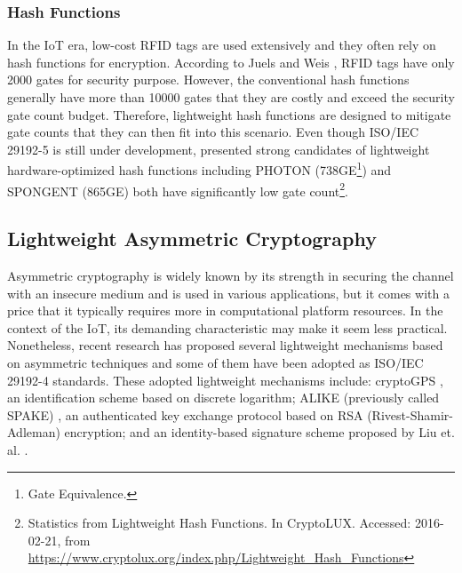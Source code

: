 \subsubsection{Hash Functions}

In the \gls{IoT} era, low-cost \gls{RFID} tags are used extensively and they often rely on hash functions for encryption. According to Juels and Weis \cite{Juels:2005}, \gls{RFID} tags have only 2000 gates for security purpose. However, the conventional hash functions generally have more than 10000 gates that they are costly and exceed the security gate count budget. Therefore, lightweight hash functions are designed to mitigate gate counts that they can then fit into this scenario. Even though ISO/IEC 29192-5 is still under development, presented strong candidates of lightweight hardware-optimized hash functions including PHOTON (738GE\footnote{Gate Equivalence.}) and SPONGENT (865GE) both have significantly low gate count\footnote{Statistics from Lightweight Hash Functions. In CryptoLUX. Accessed: 2016-02-21, from \url{https://www.cryptolux.org/index.php/Lightweight_Hash_Functions}}.

\subsection{Lightweight Asymmetric Cryptography}

Asymmetric cryptography is widely known by its strength in securing the channel with an insecure medium and is used in various applications, but it comes with a price that it typically requires more in computational platform resources. In the context of the \gls{IoT}, its demanding characteristic may make it seem less practical. Nonetheless, recent research has proposed several lightweight mechanisms based on asymmetric techniques and some of them have been adopted as ISO/IEC 29192-4 \cite{ISO29192-4:2013} standards. These adopted lightweight mechanisms include: cryptoGPS \cite{Girault:2006}, an identification scheme based on discrete logarithm; ALIKE (previously called SPAKE) \cite{Coron:2010}, an authenticated key exchange protocol based on RSA (Rivest-Shamir-Adleman) encryption; and an identity-based signature scheme proposed by Liu et. al. \cite{Liu:2010}.
